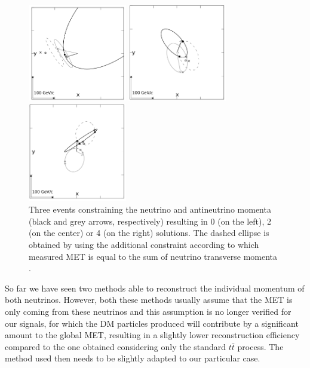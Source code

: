 \documentclass[a4paper, 10pt, openright]{report}
\begin{document}
\begin{itemize}
\begin{figure}[htbp]
\centering
\begin{minipage}[b]{.32\textwidth}
\includegraphics[width=4.3cm, height=4.3cm]{figs/ellipse0.png}
\end{minipage}\hfill
\begin{minipage}[b]{.32\textwidth}
\includegraphics[width=4.3cm, height=4.3cm]{figs/ellipse2.png}
\end{minipage} \hfill
\begin{minipage}[b]{.32\textwidth}
\includegraphics[width=4.3cm, height=4.3cm]{figs/ellipse4.png}
\end{minipage} \hfill
\caption{ Three events constraining the neutrino and antineutrino momenta (black and grey arrows, respectively) resulting in 0 (on the left), 2 (on the center) or 4 (on the right) solutions. The dashed ellipse is obtained by using the additional constraint according to which measured \ac{MET} is equal to the sum of neutrino transverse momenta \cite{Betchart}.}
\label{fig:ellipses}
\end{figure}

\end{itemize}

So far we have seen two methods able to reconstruct the individual momentum of both neutrinos. However, both these methods usually assume that the \ac{MET} is only coming from these neutrinos and this assumption is no longer verified for our signals, for which the \ac{DM} particles produced will contribute by a significant amount to the global \ac{MET}, resulting in a slightly lower reconstruction efficiency compared to the one obtained considering only the standard $t \bar t$ process. The method used then needs to be slightly adapted to our particular case.
\end{document}
